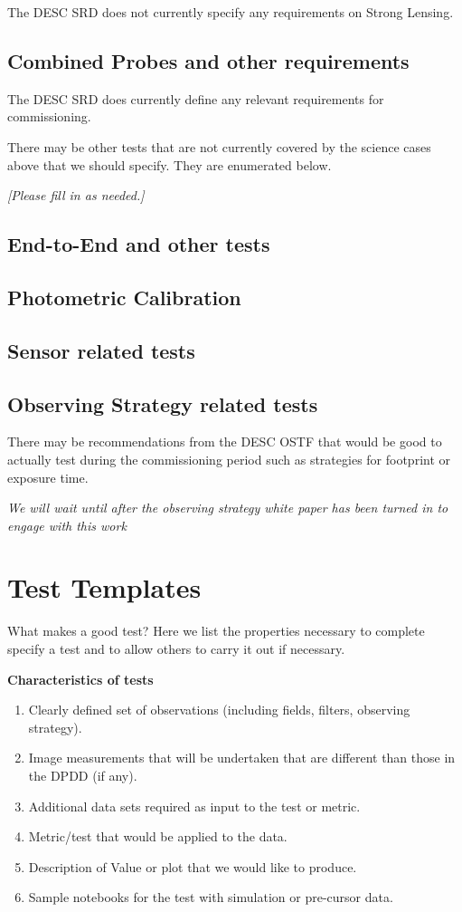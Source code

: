 \documentclass[modern]{desc-tex/styles/lsstdescnote}
\begin{document}
The DESC SRD does not currently specify any requirements on Strong Lensing.

\subsection{Combined Probes and other requirements}

The DESC SRD does currently define any relevant requirements for commissioning.

\vspace{1.0in}

There may be other tests that are not currently covered by the science cases above that we should specify.  They are enumerated below.

{\it [Please fill in as needed.]}

\subsection{End-to-End and other tests}
\subsection{Photometric Calibration}
\subsection{Sensor related tests}

\subsection{Observing Strategy related tests}

There may be recommendations from the DESC OSTF that would be good to actually test during the commissioning period such as strategies for footprint or exposure time.

{\it We will wait until after the observing strategy white paper has been turned in to engage with this work}


\appendix
\section{Test Templates}

What makes a good test?  Here we list the properties necessary to complete specify a test and to allow others to carry it out if necessary.

{\bf Characteristics of tests }
\begin{enumerate}
\item Clearly defined set of observations (including fields, filters, observing strategy).
\item Image measurements that will be undertaken that are different than those in the DPDD (if any).
\item Additional data sets required as input to the test or metric.
\item Metric/test that would be applied to the data.
\item Description of Value or plot  that we would like to produce.
\item Sample notebooks for the test with simulation or pre-cursor data.
\end{enumerate}
\end{document}
